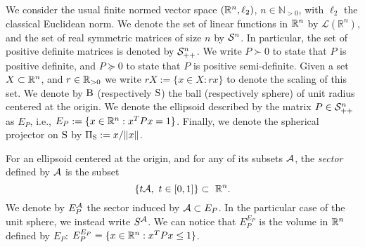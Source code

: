 We consider the usual finite normed vector space $(\mathbb{R}^n,\ell_2)$, $n \in \mathbb{N}_{> 0}$, with $\ell_2$ the classical Euclidean norm. We denote the set of linear functions in $\mathbb{R}^n$ by $\mathcal{L}(\mathbb{R}^n)$, and the set of real symmetric matrices of size $n$ by $\mathcal{S}^n$. In particular, the set of positive definite matrices is denoted by $\mathcal{S}^n_{++}$. We write $P \succ 0$ to state that $P$ is positive definite, and $P \succeq 0$ to state that $P$ is positive semi-definite. Given a set $X \subset \mathbb{R}^n$, and $r \in \mathbb{R}_{> 0}$ we write \mbox{$rX := \{x \in X : rx\}$} to denote the scaling of this set. We denote by $\text{B}$ (respectively $\text{S}$) the ball (respectively sphere) of unit radius centered at the origin.  We denote the ellipsoid described by the matrix $P \in \mathcal{S}^n_{++}$ as $E_P$, i.e., $E_P:= \{x \in \mathbb{R}^n: x^TPx = 1\}$. Finally, we denote the spherical projector on $\text{S}$ by $\Pi_{\text{S}} := x/\Vert x\Vert$. %


For an ellipsoid centered at the origin, and for any of its subsets $\mathcal{A}$, the \emph{sector} defined by $\mathcal{A}$ is the subset $$\{t \calA, \ t \in [0,1]\} \subset\ \R^n.$$ We denote by $E_P^{\mathcal{A}}$ the sector induced by $\mathcal{A} \subset E_P$. In the particular case of the unit sphere, we instead write $S^{\mathcal{A}}$. We can notice that $E_P^{E_P}$ is the volume in $\mathbb{R}^n$ defined by $E_P$: $E_P^{E_P} = \{x \in \mathbb{R}^n: x^TPx \leq 1\}$.

